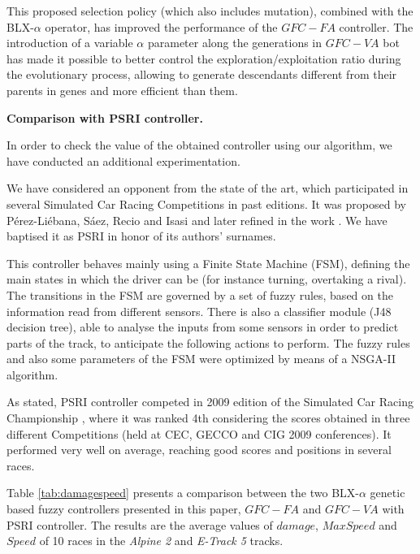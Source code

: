 \documentclass[conference]{IEEEtran}
\begin{document}
This proposed selection policy (which also includes mutation),
combined with the BLX-$\alpha$ operator, has improved the performance
of the $GFC-FA$ controller. 
The introduction of a variable $\alpha$ parameter along the
generations in $GFC-VA$ bot has made it possible to better control the
exploration/exploitation ratio during the evolutionary process,
allowing to generate descendants different from their parents in genes
and more efficient than them. 


\textbf{Comparison with PSRI controller.}

In order to check the value of the obtained controller using our algorithm, we have conducted an additional experimentation.

We have considered an opponent from the state of the art, which participated in several Simulated Car Racing Competitions in past editions. 
It was proposed by P{\'e}rez-Li{\'e}bana, S{\'a}ez, Recio and Isasi \cite{EvolvingRuleSystem08} and later refined in the work \cite{PerezEvolvingFuzzy09}. We have baptised it as PSRI in honor of its authors' surnames.

This controller behaves mainly using a Finite State Machine (FSM), defining the main states in which the driver can be (for instance turning, overtaking a rival). The transitions in the FSM are governed by a set of fuzzy rules, based on the information read from different sensors. There is also a classifier module (J48 decision tree), able to analyse the inputs from some sensors in order to predict parts of the track, to anticipate the following actions to perform. The fuzzy rules and also some parameters of the FSM were optimized by means of a NSGA-II algorithm.

As stated, PSRI controller competed in 2009 edition of the Simulated
Car Racing Championship \cite{SimulatedCarRacing-2010}, where it was
ranked 4th considering the scores obtained in three different
Competitions (held at CEC, GECCO and CIG 2009 conferences). It
performed very well on average, reaching good scores and positions in
several races.

Table \ref{tab:damagespeed} presents a comparison between the two
BLX-$\alpha$ genetic based fuzzy controllers presented in this paper,
\textbf{$GFC-FA$} and \textbf{$GFC-VA$} with PSRI controller. The
results are the average values of $damage$, $MaxSpeed$ and $Speed$ of
10 races in the \textit{Alpine 2} and \textit{E-Track 5} tracks. 
\end{document}
